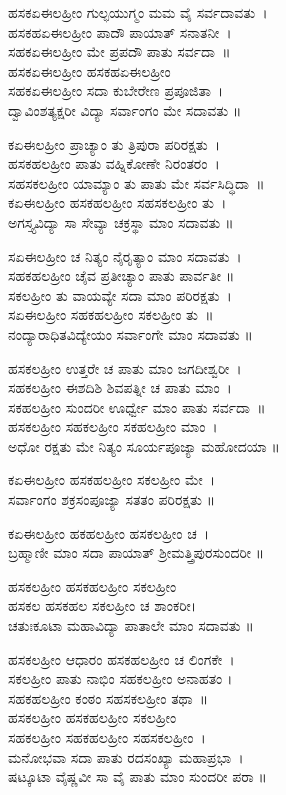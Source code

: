 ಹಸಕಏಈಲಹ್ರೀಂ ಗುಲ್ಫಯುಗ್ಮಂ ಮಮ ವೈ ಸರ್ವದಾವತು~।\\
ಹಸಕಹಏಈಲಹ್ರೀಂ ಪಾದೌ ಪಾಯಾತ್ ಸನಾತನೀ~।\\
ಸಹಕಏಈಲಹ್ರೀಂ ಮೇ ಪ್ರಪದೌ ಪಾತು ಸರ್ವದಾ~॥\\
ಹಸಕಏಈಲಹ್ರೀಂ ಹಸಕಹಏಈಲಹ್ರೀಂ\\
ಸಹಕಏಈಲಹ್ರೀಂ ಸದಾ ಕುಬೇರೇಣ ಪ್ರಪೂಜಿತಾ~।\\
ದ್ವಾವಿಂಶತ್ಯಕ್ಷರೀ ವಿದ್ಯಾ ಸರ್ವಾಂಗಂ ಮೇ ಸದಾವತು ॥

ಕಏಈಲಹ್ರೀಂ ಪ್ರಾಚ್ಯಾಂ ತು ತ್ರಿಪುರಾ ಪರಿರಕ್ಷತು~।\\
ಹಸಕಹಲಹ್ರೀಂ ಪಾತು ವಹ್ನಿಕೋಣೇ ನಿರಂತರಂ~।\\
ಸಹಸಕಲಹ್ರೀಂ ಯಾಮ್ಯಾಂ ತು ಪಾತು ಮೇ ಸರ್ವಸಿದ್ಧಿದಾ~॥\\
ಕಏಈಲಹ್ರೀಂ ಹಸಕಹಲಹ್ರೀಂ ಸಹಸಕಲಹ್ರೀಂ ತು~।\\
ಅಗಸ್ತ್ಯವಿದ್ಯಾ ಸಾ ಸೇವ್ಯಾ ಚಕ್ರಸ್ಥಾ ಮಾಂ ಸದಾವತು ॥

ಸಏಈಲಹ್ರೀಂ ಚ ನಿತ್ಯಂ ನೈರೃತ್ಯಾಂ ಮಾಂ ಸದಾವತು~।\\
ಸಹಕಹಲಹ್ರೀಂ ಚೈವ ಪ್ರತೀಚ್ಯಾಂ ಪಾತು ಪಾರ್ವತೀ ॥\\
ಸಕಲಹ್ರೀಂ ತು ವಾಯವ್ಯೇ ಸದಾ ಮಾಂ ಪರಿರಕ್ಷತು~।\\
ಸಏಈಲಹ್ರೀಂ ಸಹಕಹಲಹ್ರೀಂ ಸಕಲಹ್ರೀಂ ತು~॥\\
ನಂದ್ಯಾರಾಧಿತವಿದ್ಯೇಯಂ ಸರ್ವಾಂಗೇ ಮಾಂ ಸದಾವತು ॥

ಹಸಕಲಹ್ರೀಂ ಉತ್ತರೇ ಚ ಪಾತು ಮಾಂ ಜಗದೀಶ್ವರೀ~।\\
ಸಹಕಲಹ್ರೀಂ ಈಶದಿಶಿ ಶಿವಪತ್ನೀ ಚ ಪಾತು ಮಾಂ~।\\
ಸಕಹಲಹ್ರೀಂ ಸುಂದರೀ ಊರ್ಧ್ವೇ ಮಾಂ ಪಾತು ಸರ್ವದಾ~॥\\
ಹಸಕಲಹ್ರೀಂ ಸಹಕಲಹ್ರೀಂ ಸಕಹಲಹ್ರೀಂ ಮಾಂ~।\\
ಅಧೋ ರಕ್ಷತು ಮೇ ನಿತ್ಯಂ ಸೂರ್ಯಪೂಜ್ಯಾ ಮಹೋದಯಾ ॥

ಕಏಈಲಹ್ರೀಂ ಹಸಕಹಲಹ್ರೀಂ ಸಕಲಹ್ರೀಂ ಮೇ~।\\
ಸರ್ವಾಂಗಂ ಶಕ್ರಸಂಪೂಜ್ಯಾ ಸತತಂ ಪರಿರಕ್ಷತು ॥

ಕಏಈಲಹ್ರೀಂ ಹಕಹಲಹ್ರೀಂ ಹಸಕಲಹ್ರೀಂ ಚ~।\\
ಬ್ರಹ್ಮಾಣೀ ಮಾಂ ಸದಾ ಪಾಯಾತ್ ಶ್ರೀಮತ್ತ್ರಿಪುರಸುಂದರೀ ॥

ಹಸಕಲಹ್ರೀಂ ಹಸಕಹಲಹ್ರೀಂ ಸಕಲಹ್ರೀಂ \\ಹಸಕಲ ಹಸಕಹಲ ಸಕಲಹ್ರೀಂ ಚ ಶಾಂಕರೀ।\\
ಚತುಃಕೂಟಾ ಮಹಾವಿದ್ಯಾ ಪಾತಾಲೇ ಮಾಂ ಸದಾವತು ॥

ಹಸಕಲಹ್ರೀಂ ಆಧಾರಂ ಹಸಕಹಲಹ್ರೀಂ ಚ ಲಿಂಗಕೇ~।\\
ಸಕಲಹ್ರೀಂ ಪಾತು ನಾಭಿಂ ಸಹಕಲಹ್ರೀಂ ಅನಾಹತಂ ।\\
ಸಹಕಹಲಹ್ರೀಂ ಕಂಠಂ ಸಹಸಕಲಹ್ರೀಂ ತಥಾ~॥\\
ಹಸಕಲಹ್ರೀಂ ಹಸಕಹಲಹ್ರೀಂ ಸಕಲಹ್ರೀಂ \\ಸಹಕಲಹ್ರೀಂ ಸಹಕಹಲಹ್ರೀಂ ಸಹಸಕಲಹ್ರೀಂ~।\\
ಮನೋಭವಾ ಸದಾ ಪಾತು ರದಸಂಖ್ಯಾ ಮಹಾಪ್ರಭಾ~।\\
ಷಟ್ಕೂಟಾ ವೈಷ್ಣವೀ ಸಾ ವೈ ಪಾತು ಮಾಂ ಸುಂದರೀ ಪರಾ ॥

